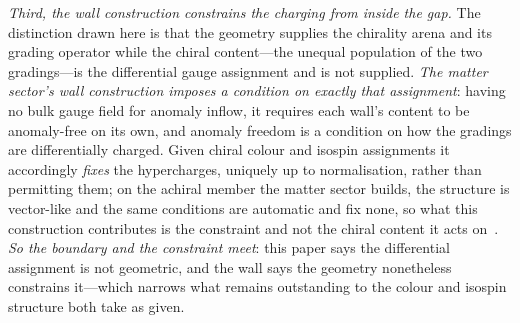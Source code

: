 \documentclass[11pt]{article}
\theoremstyle{plain}
\theoremstyle{remark}
\begin{document}
\emph{Third, the wall construction constrains the charging from inside the gap.} The distinction drawn here is that the geometry supplies the chirality arena and its grading operator while the chiral content---the unequal population of the two gradings---is the differential gauge assignment and is not supplied. \emph{The matter sector's wall construction imposes a condition on exactly that assignment}: having no bulk gauge field for anomaly inflow, it requires each wall's content to be anomaly-free on its own, and anomaly freedom is a condition on how the gradings are differentially charged. Given chiral colour and isospin assignments it accordingly \emph{fixes} the hypercharges, uniquely up to normalisation, rather than permitting them; on the achiral member the matter sector builds, the structure is vector-like and the same conditions are automatic and fix none, so what this construction contributes is the constraint and not the chiral content it acts on~\cite{JanzenMatter}. \emph{So the boundary and the constraint meet}: this paper says the differential assignment is not geometric, and the wall says the geometry nonetheless constrains it---which narrows what remains outstanding to the colour and isospin structure both take as given.
\end{document}
